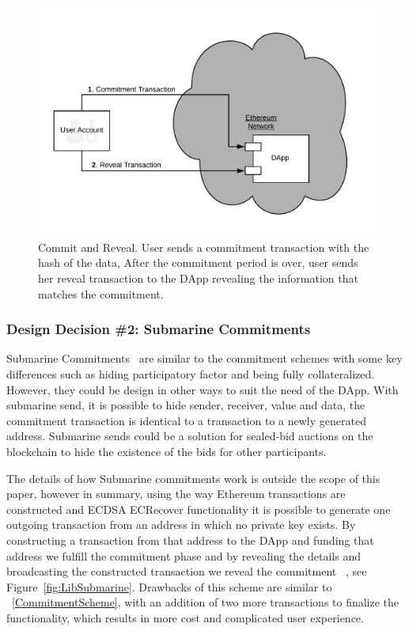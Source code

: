 \begin{figure}[h]
\centering
\includegraphics[width=0.5\linewidth]{figures/commit-reveal.png}
\caption{ Commit and Reveal. User sends a commitment transaction with the hash of the data, After the commitment period is over, user sends her reveal transaction to the DApp revealing the information that matches the commitment. \label{fig:commitReveal}}
\end{figure}

\subsubsection{Design Decision \#2: Submarine Commitments\newline}\label{submarineCommits}
Submarine Commitments~\cite{breidenbach2018enter, submarinesendHD} are similar to the commitment schemes with some key differences such as hiding participatory factor and being fully collateralized. However, they could be design in other ways to suit the need of the DApp. With submarine send, it is possible to hide sender, receiver, value and data, the commitment transaction is identical to a transaction to a newly generated address. Submarine sends could be a solution for sealed-bid auctions on the blockchain to hide the existence of the bids for other participants. 

The details of how Submarine commitments work is outside the scope of this paper, however in summary, using the way Ethereum transactions are constructed and ECDSA ECRecover functionality it is possible to generate one outgoing transaction from an address in which no private key exists. By constructing a transaction from that address to the DApp and funding that address we fulfill the commitment phase and by revealing the details and broadcasting the constructed transaction we reveal the commitment ~\cite{libsubmarine}, see Figure~\ref{fig:LibSubmarine}.  Drawbacks of this scheme are similar to ~\ref{CommitmentScheme}, with an addition of two more transactions to finalize the functionality, which results in more cost and complicated user experience.


